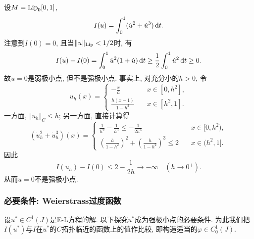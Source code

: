 \begin{example}
    设$M = {\rm Lip}_0[0, 1]$, 
    \begin{equation*}
        I(u)=\int_0^1(\dot u^2+\dot u^3) \,{\rm d}t.
    \end{equation*}
    注意到$I(0) = 0$, 且当$\Vert u \Vert_{{\rm Lip}} < 1/2$时, 有 
    \begin{equation*}
        I(u) - I(0) = \int_0^1\dot u^2(1 + \dot u) \,{\rm d}t \geq \frac{1}{2}\int_0^1\dot u^2 \,{\rm d}t \geq 0. 
    \end{equation*}
    故$u = 0$是弱极小点, 但不是强极小点. 事实上, 对充分小的$h > 0$, 令 
    \begin{equation*}
        u_h(x) =  
        \begin{cases} 
            \displaystyle-\frac{x}{h} \quad &x \in [0, h^2], \\  
            \displaystyle\frac{h(x - 1)}{1 - h^2} \quad &x \in [h^2, 1]. 
        \end{cases}
    \end{equation*}
    一方面, $\Vert u_h \Vert_C \leq h$; 另一方面, 直接计算得 
    \begin{equation} 
        (\dot u_h^2 + \dot u_h^3)(x) =  
        \begin{cases} 
            \displaystyle \frac{1}{h^2} - \frac{1}{h^3} \leq -\frac{1}{2h^3} \quad &x \in [0, h^2), \\  
            \displaystyle \left(\frac{h}{1 - h^2}\right)^2 + \left(\frac{h}{1 - h^2}\right)^3 \leq 2 \quad &x \in (h^2, 1]. 
        \end{cases} 
    \end{equation}
    因此
    \begin{equation*}
        I(u_h) - I(0) \leq 2 - \frac{1}{2h} \rightarrow -\infty \quad (h \rightarrow 0^+).
    \end{equation*}
    从而$u = 0$不是强极小点.
\end{example}

\subsubsection{必要条件: Weierstrass过度函数}

设$u^* \in C^1(J)$是E-L方程的解. 以下探究$u^*$成为强极小点的必要条件.
为此我们把$I(u^*)$与$I$在$u^*$的$C$拓扑临近的函数上的值作比较, 即构造适当的$\varphi \in C_0^1(J)$.

